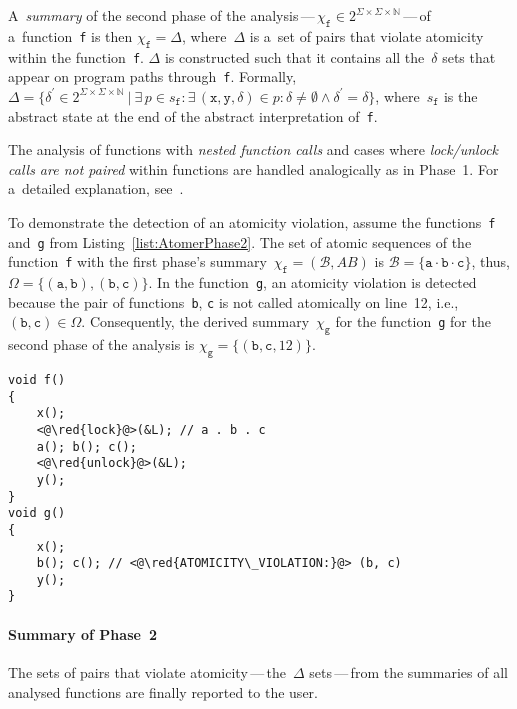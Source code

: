 A~\emph{summary} of the second phase of the analysis\,---\,$ \chi_\mathtt{f} \in 2^{\Sigma \times \Sigma \times \mathbb{N}} $\,---\,of a~function~\texttt{f} is then $ \chi_\mathtt{f} = \Delta $, where~$ \Delta $ is a~set of pairs that violate atomicity within the function~\texttt{f}. $ \Delta $ is constructed such that it contains all the~$ \delta $ sets that appear on program paths through~\texttt{f}. Formally, $ \Delta = \{\delta^\prime \in 2^{\Sigma \times \Sigma \times \mathbb{N}}\ |\ \exists\,p \in s_\mathtt{f} : \exists\,(\mathtt{x}, \mathtt{y}, \delta) \in p : \delta \neq \emptyset \wedge \delta^\prime = \delta\} $, where~$ s_\mathtt{f} $ is the abstract state at the end of the abstract interpretation of~\texttt{f}.

The analysis of functions with \emph{nested function calls} and cases where \emph{lock/unlock calls are not paired} within functions are handled analogically as in Phase~1. For a~detailed explanation, see~\cite{harmimBP}.

\begin{example}
    To demonstrate the detection of an atomicity violation, assume the functions~\texttt{f} and~\texttt{g} from Listing~\ref{list:AtomerPhase2}. The set of atomic sequences of the function~\texttt{f} with the first phase's summary~$ \chi_\mathtt{f} = (\mathcal{B}, AB) $ is $ \mathcal{B} = \{\mathtt{a} \cdot \mathtt{b} \cdot \mathtt{c}\} $, thus, $ \Omega = \{(\mathtt{a}, \mathtt{b}), (\mathtt{b}, \mathtt{c})\} $. In the function~\texttt{g}, an atomicity violation is detected because the pair of functions~\texttt{b}, \texttt{c} is not called atomically on line~12, i.e., $ (\mathtt{b}, \mathtt{c}) \in \Omega $. Consequently, the derived summary~$ \chi_\mathtt{g} $ for the function~\texttt{g} for the second phase of the analysis is $ \chi_\mathtt{g} = \{(\mathtt{b}, \mathtt{c}, 12)\} $.
\end{example}

\begin{lstlisting}[style=c, label={list:AtomerPhase2}, float=hbt, caption={An example of an \emph{atomicity violation}}]
void f()
{
    x();
    <@\red{lock}@>(&L); // a . b . c
    a(); b(); c();
    <@\red{unlock}@>(&L);
    y();
}
void g()
{
    x();
    b(); c(); // <@\red{ATOMICITY\_VIOLATION:}@> (b, c)
    y();
}
\end{lstlisting}

\paragraph{Summary of Phase~2}
The sets of pairs that violate atomicity\,---\,the~$ \Delta $ sets\,---\,from the summaries of all analysed functions are finally reported to the user.


